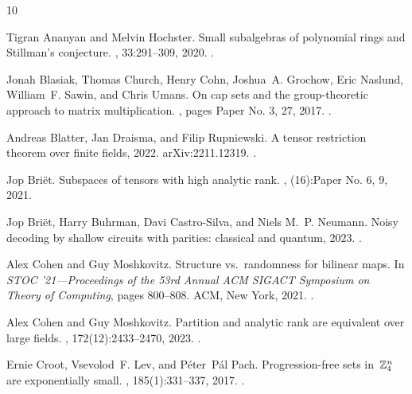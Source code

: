 \begin{thebibliography}{10}

Tigran Ananyan and Melvin Hochster.
\newblock Small subalgebras of polynomial rings and {S}tillman's conjecture.
, 33:291--309, 2020.
\newblock \href {https://doi.org/10.1090/jams/932} {}.

Jonah Blasiak, Thomas Church, Henry Cohn, Joshua~A. Grochow, Eric Naslund, William~F. Sawin, and Chris Umans.
\newblock On cap sets and the group-theoretic approach to matrix multiplication.
, pages Paper No. 3, 27, 2017.
\newblock \href {https://doi.org/10.19086/da.1245} {}.

Andreas Blatter, Jan Draisma, and Filip Rupniewski.
\newblock A tensor restriction theorem over finite fields, 2022.
\newblock arXiv:2211.12319.
\newblock \href {https://doi.org/10.48550/ARXIV.2211.12319} {}.

Jop Bri\"{e}t.
\newblock Subspaces of tensors with high analytic rank.
, (16):Paper No. 6, 9, 2021.

Jop Briët, Harry Buhrman, Davi Castro-Silva, and Niels M.~P. Neumann.
\newblock Noisy decoding by shallow circuits with parities: classical and quantum, 2023.
\newblock \href {https://doi.org/10.48550/ARXIV.2302.02870} {}.

Alex Cohen and Guy Moshkovitz.
\newblock Structure vs.\ randomness for bilinear maps.
\newblock In {\em S{TOC} '21---{P}roceedings of the 53rd {A}nnual {ACM} {SIGACT} {S}ymposium on {T}heory of {C}omputing}, pages 800--808. ACM, New York, 2021.
\newblock \href {https://doi.org/10.1145/3406325.3451007} {}.

Alex Cohen and Guy Moshkovitz.
\newblock Partition and analytic rank are equivalent over large fields.
, 172(12):2433--2470, 2023.
\newblock \href {https://doi.org/10.1215/00127094-2022-0086} {}.

Ernie Croot, Vsevolod~F. Lev, and P\'{e}ter~P\'{a}l Pach.
\newblock Progression-free sets in~{$\Bbb Z^n_4$} are exponentially small.
, 185(1):331--337, 2017.
\newblock \href {https://doi.org/10.4007/annals.2017.185.1.7} {}.


\end{thebibliography}
